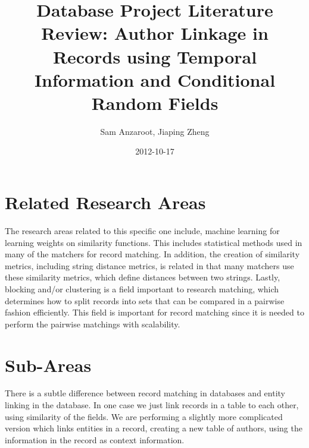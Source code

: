 \documentclass[]{article}
\title{Database Project Literature Review: Author Linkage in Records using Temporal Information and Conditional Random Fields}
\author{Sam Anzaroot, Jiaping Zheng}
\date{2012-10-17}
\begin{document}
\ifpdf
{}
\else
{}
\fi

\maketitle

\section{Related Research Areas} %
\label{sec:related_research_areas}
The research areas related to this specific one include, machine learning for learning weights on similarity functions. This includes statistical methods used in many of the matchers for record matching. In addition, the creation of similarity metrics, including string distance metrics, is related in that many matchers use these similarity metrics, which define distances between two strings. Lastly, blocking and/or clustering is a field important to research matching, which determines how to split records into sets that can be compared in a pairwise fashion efficiently. This field is important for record matching since it is needed to perform the pairwise matchings with scalability. 

\section{Sub-Areas} %
\label{sec:sub_areas}
There is a subtle difference between record matching in databases and entity linking in the database. In one case we just link records in a table to each other, using similarity of the fields. We are performing a slightly more complicated version which links entities in a record, creating a new table of authors, using the information in the record as context information.
\end{document}
